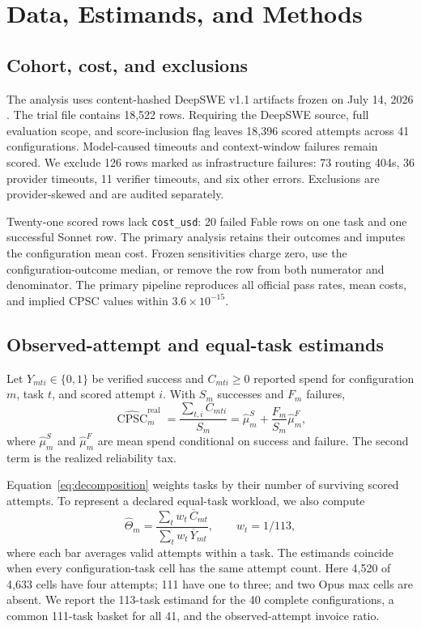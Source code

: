 \documentclass[11pt]{article}
\newcommand{\cpsc}{\operatorname{CPSC}}
\newcommand{\config}[1]{\texttt{#1}}
\begin{document}
\section{Data, Estimands, and Methods}

\subsection{Cohort, cost, and exclusions}

The analysis uses content-hashed DeepSWE v1.1 artifacts frozen on July 14, 2026
\citep{deepswe2026v11}. The trial file contains 18,522 rows. Requiring the DeepSWE source, full
evaluation scope, and score-inclusion flag leaves 18,396 scored attempts across 41 configurations.
Model-caused timeouts and context-window failures remain scored. We exclude 126
rows marked as infrastructure failures: 73 routing 404s, 36 provider timeouts, 11 verifier
timeouts, and six other errors. Exclusions are provider-skewed and are audited separately.

Twenty-one scored rows lack \config{cost\_usd}: 20 failed Fable rows on one task and one successful
Sonnet row. The primary analysis retains their outcomes and imputes the configuration mean cost.
Frozen sensitivities charge zero, use the configuration-outcome median, or remove the row from both
numerator and denominator. The primary pipeline reproduces all official pass rates, mean costs, and
implied CPSC values within $3.6\times10^{-15}$.

\subsection{Observed-attempt and equal-task estimands}

Let $Y_{mti}\in\{0,1\}$ be verified success and $C_{mti}\geq0$ reported spend for configuration
$m$, task $t$, and scored attempt $i$. With $S_m$ successes and $F_m$ failures,
\begin{equation}
\widehat{\cpsc}^{\mathrm{real}}_m
=\frac{\sum_{t,i}C_{mti}}{S_m}
=\widehat\mu^S_m+\frac{F_m}{S_m}\widehat\mu^F_m,
\label{eq:decomposition}
\end{equation}
where $\widehat\mu^S_m$ and $\widehat\mu^F_m$ are mean spend conditional on success and failure.
The second term is the realized reliability tax.

Equation~\ref{eq:decomposition} weights tasks by their number of surviving scored attempts. To
represent a declared equal-task workload, we also compute
\begin{equation}
\widehat\Theta_m
=\frac{\sum_t w_t\,\overline C_{mt}}
       {\sum_t w_t\,\overline Y_{mt}}, \qquad w_t=1/113,
\label{eq:equal-task}
\end{equation}
where each bar averages valid attempts within a task. The estimands coincide when every
configuration-task cell has the same attempt count. Here 4,520 of 4,633 cells have four attempts;
111 have one to three; and two Opus max cells are absent. We report the 113-task estimand for the 40
complete configurations, a common 111-task basket for all 41, and the observed-attempt invoice
ratio.
\end{document}

